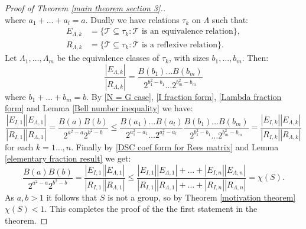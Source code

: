 \documentclass[10pt,a4paper]{amsart}
\begin{document}
\begin{proof}[Proof of Theorem \ref{main theorem section 3}.]
\begin{equation}
    \end{equation}
    where $a_1 + \dots + a_l = a$.
    Dually we have relations $\tau_k$ on $\Lambda$ such that:
    \begin{align*}
        E_{\Lambda,k} & = \{\mathcal{T} \subseteq \tau_k : \mathcal{T} \text{ is an equivalence relation} \}, \\
        R_{\Lambda,k} & = \{\mathcal{T} \subseteq \tau_k : \mathcal{T} \text{ is a reflexive relation} \}.
    \end{align*}
    Let $\Lambda_1 , \ldots , \Lambda_m$ be the equivalence classes of $\tau_k$, with sizes $b_1 , \ldots , b_m$.
    Then:
    \begin{equation}
        \label{Lambda fraction form}
        \frac{|E_{\Lambda,k}|} {|R_{\Lambda,k}|} = \frac{B(b_1) \dots B(b_m)}{2^{b_1^2 - b_1} \dots 2^{b_m^2 - b_m}}
    \end{equation}
    where $b_1 + \dots + b_m = b$.
    By \eqref{N = G case}, \eqref{I fraction form}, \eqref{Lambda fraction form} and Lemma \ref{Bell number inequality} we have:
    \begin{equation*}
        \frac{|E_{I,1}||E_{\Lambda,1}| }{|R_{I,1}||R_{\Lambda,1}|} = \frac{B(a)B(b)}{2^{a^2 - a}2^{b^2 - b}} \leq \frac{B(a_1) \dots B(a_l)}{2^{a_1^2 - a_1} \dots 2^{a_l^2 - a_l}} \frac{B(b_1) \dots B(b_m)}{2^{b_1^2 - b_1} \dots 2^{b_m^2 - b_m}} = \frac{|E_{I,k}||E_{\Lambda,k}|}{|R_{I,k}||R_{\Lambda,k}|}
    \end{equation*}
    for each $k = 1 \dots , n$.
    Finally by \eqref{DSC coef form for Rees matrix} and Lemma \ref{elementary fraction result} we get:
    \begin{equation*}
        \frac{B(a) B(b)}{2^{a^2 - a}2^{b^2-b}} = \frac{|E_{I,1}||E_{\Lambda,1}| }{|R_{I,1}||R_{\Lambda,1}|} \leq  \frac{|E_{I,1}||E_{\Lambda ,1}| + \dots + |E_{I,n}||E_{\Lambda,n}|}{|R_{I,1}||R_{\Lambda ,1}| + \dots +|R_{I,n}||R_{\Lambda,n}|} =  \chi(S).
    \end{equation*}
    As $a,b >1$ it follows that $S$ is not a group, so by Theorem \ref{motivation theorem} $\chi(S) < 1$.
    This completes the proof of the the first statement in the theorem.


\end{proof}
\end{document}
